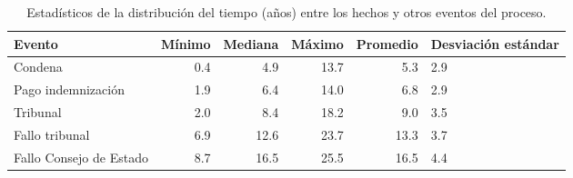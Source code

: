 \begin{table}[htbp]
\centering
\caption{Estadísticos de la distribución del
tiempo (años) entre los hechos y otros eventos del proceso.} 
\label{tab:hechos-evento}
\begin{tabular}{lrrrrR{2cm}}
  \hline
Evento & Mínimo & Mediana & Máximo & Promedio & Desviación estándar \\ 
  \hline
Condena & 0.4 & 4.9 & 13.7 & 5.3 & 2.9 \\ 
  Pago indemnización & 1.9 & 6.4 & 14.0 & 6.8 & 2.9 \\ 
  Tribunal & 2.0 & 8.4 & 18.2 & 9.0 & 3.5 \\ 
  Fallo tribunal & 6.9 & 12.6 & 23.7 & 13.3 & 3.7 \\ 
  Fallo Consejo de Estado & 8.7 & 16.5 & 25.5 & 16.5 & 4.4 \\ 
   \hline
\end{tabular}
\end{table}
